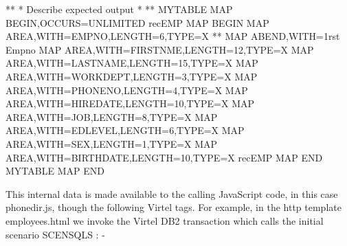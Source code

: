 \documentclass[letterpaper,10pt,english]{sphinxmanual}
\begin{document}
\begin{sphinxVerbatim}[commandchars=\\\{\}]
*\PYGZhy{}\PYGZhy{}\PYGZhy{}\PYGZhy{}\PYGZhy{}\PYGZhy{}\PYGZhy{}\PYGZhy{}\PYGZhy{}\PYGZhy{}\PYGZhy{}\PYGZhy{}\PYGZhy{}\PYGZhy{}\PYGZhy{}\PYGZhy{}\PYGZhy{}\PYGZhy{}\PYGZhy{}\PYGZhy{}\PYGZhy{}\PYGZhy{}\PYGZhy{}\PYGZhy{}\PYGZhy{}\PYGZhy{}\PYGZhy{}\PYGZhy{}\PYGZhy{}\PYGZhy{}\PYGZhy{}\PYGZhy{}\PYGZhy{}\PYGZhy{}\PYGZhy{}\PYGZhy{}\PYGZhy{}\PYGZhy{}\PYGZhy{}\PYGZhy{}\PYGZhy{}\PYGZhy{}\PYGZhy{}\PYGZhy{}\PYGZhy{}\PYGZhy{}\PYGZhy{}\PYGZhy{}\PYGZhy{}\PYGZhy{}\PYGZhy{}\PYGZhy{}\PYGZhy{}\PYGZhy{}\PYGZhy{}\PYGZhy{}\PYGZhy{}\PYGZhy{}\PYGZhy{}\PYGZhy{}\PYGZhy{}\PYGZhy{}\PYGZhy{}\PYGZhy{}\PYGZhy{}\PYGZhy{}\PYGZhy{}\PYGZhy{}\PYGZhy{}*
* Describe expected output                                            *
*\PYGZhy{}\PYGZhy{}\PYGZhy{}\PYGZhy{}\PYGZhy{}\PYGZhy{}\PYGZhy{}\PYGZhy{}\PYGZhy{}\PYGZhy{}\PYGZhy{}\PYGZhy{}\PYGZhy{}\PYGZhy{}\PYGZhy{}\PYGZhy{}\PYGZhy{}\PYGZhy{}\PYGZhy{}\PYGZhy{}\PYGZhy{}\PYGZhy{}\PYGZhy{}\PYGZhy{}\PYGZhy{}\PYGZhy{}\PYGZhy{}\PYGZhy{}\PYGZhy{}\PYGZhy{}\PYGZhy{}\PYGZhy{}\PYGZhy{}\PYGZhy{}\PYGZhy{}\PYGZhy{}\PYGZhy{}\PYGZhy{}\PYGZhy{}\PYGZhy{}\PYGZhy{}\PYGZhy{}\PYGZhy{}\PYGZhy{}\PYGZhy{}\PYGZhy{}\PYGZhy{}\PYGZhy{}\PYGZhy{}\PYGZhy{}\PYGZhy{}\PYGZhy{}\PYGZhy{}\PYGZhy{}\PYGZhy{}\PYGZhy{}\PYGZhy{}\PYGZhy{}\PYGZhy{}\PYGZhy{}\PYGZhy{}\PYGZhy{}\PYGZhy{}\PYGZhy{}\PYGZhy{}\PYGZhy{}\PYGZhy{}\PYGZhy{}\PYGZhy{}*
MYTABLE MAP\PYGZdl{} BEGIN,OCCURS=UNLIMITED
recEMP   MAP\PYGZdl{} BEGIN
         MAP\PYGZdl{} AREA,WITH=\PYGZsq{}EMPNO\PYGZsq{},LENGTH=6,TYPE=X
**       MAP\PYGZdl{} ABEND,WITH=\PYGZsq{}1rst Empno\PYGZsq{}
         MAP\PYGZdl{} AREA,WITH=\PYGZsq{}FIRSTNME\PYGZsq{},LENGTH=12,TYPE=X
         MAP\PYGZdl{} AREA,WITH=\PYGZsq{}LASTNAME\PYGZsq{},LENGTH=15,TYPE=X
         MAP\PYGZdl{} AREA,WITH=\PYGZsq{}WORKDEPT\PYGZsq{},LENGTH=3,TYPE=X
         MAP\PYGZdl{} AREA,WITH=\PYGZsq{}PHONENO\PYGZsq{},LENGTH=4,TYPE=X
         MAP\PYGZdl{} AREA,WITH=\PYGZsq{}HIREDATE\PYGZsq{},LENGTH=10,TYPE=X
         MAP\PYGZdl{} AREA,WITH=\PYGZsq{}JOB\PYGZsq{},LENGTH=8,TYPE=X
         MAP\PYGZdl{} AREA,WITH=\PYGZsq{}EDLEVEL\PYGZsq{},LENGTH=6,TYPE=X
         MAP\PYGZdl{} AREA,WITH=\PYGZsq{}SEX\PYGZsq{},LENGTH=1,TYPE=X
         MAP\PYGZdl{} AREA,WITH=\PYGZsq{}BIRTHDATE\PYGZsq{},LENGTH=10,TYPE=X
recEMP   MAP\PYGZdl{} END
MYTABLE  MAP\PYGZdl{} END
\end{sphinxVerbatim}

This internal data is made available to the calling JavaScript code, in this case phonedir.js, though the following Virtel tags. For example, in the http template employees.html we invoke the Virtel DB2 transaction which calls the initial scenario SCENSQLS : -
\end{document}
